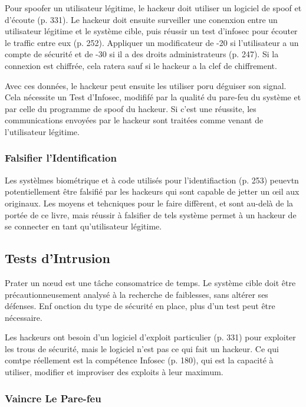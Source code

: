 Pour spoofer un utilisateur légitime, le hackeur doit utiliser un logiciel de spoof et d'écoute (p. 331). Le hackeur doit ensuite surveiller une conenxion entre un utilisateur légitime et le système cible, puis réussir un test d'infosec pour écouter le traffic entre eux (p. 252). Appliquer un modificateur de -20 si l'utilisateur a un compte de sécurité et de -30 si il a des droits administrateurs (p. 247). Si la connexion est chiffrée, cela ratera sauf si le hackeur a la clef de chiffrement. 

Avec ces données, le hackeur peut ensuite les utiliser poru déguiser son signal. Cela nécessite un Test d'Infosec, modififé par la qualité du pare-feu du système et par celle du programme de spoof du hackeur. Si c'est une réussite, les communications envoyées par le hackeur sont traitées comme venant de l'utilisateur légitime. 

\subsubsection{Falsifier l'Identification} 

Les systèlmes biométrique et à code utilisés pour l'identifiaction (p. 253) peuevtn potentiellement être falsifié par les hackeurs qui sont capable de jetter un œil aux originaux. Les moyens et tehcniques pour le faire diffèrent, et sont au-delà de la portée de ce livre, mais réussir à falsifier de tels système permet à un hackeur de se connecter en tant qu'utilisateur légitime. 

\subsection{Tests d'Intrusion} 

Prater un nœud est une tâche consomatrice de temps. Le système cible doit être précautionneusement analysé à la recherche de faiblesses, sans altérer ses défenses. Enf onction du type de sécurité en place, plus d'un test peut être nécessaire. 

Les hackeurs ont besoin d'un logiciel d'exploit particulier (p. 331) pour exploiter les trous de sécurité, mais le logiciel n'est pas ce qui fait un hackeur. Ce qui comtpe réellement est la compétence Infosec (p. 180), qui est la capacité à utiliser, modifier et improviser des exploits à leur maximum. 

\subsubsection{Vaincre Le Pare-feu} 


